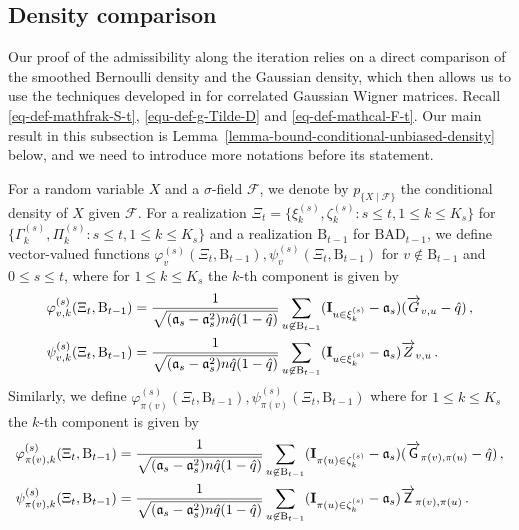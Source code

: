 \documentclass[11pt]{article}
\numberwithin{equation}{section}
\begin{document}
\subsection{Density comparison}
\label{sec:density-compare}
Our proof of the admissibility along the iteration relies on a direct comparison of the smoothed Bernoulli density and the Gaussian density, which then allows us to  use the techniques developed in \cite{DL22+} for correlated Gaussian Wigner matrices. Recall \eqref{eq-def-mathfrak-S-t}, \eqref{equ-def-g-Tilde-D} and \eqref{eq-def-mathcal-F-t}. Our main result in this subsection is Lemma~\ref{lemma-bound-conditional-unbiased-density} below, and we need to introduce more notations before its statement.

For a random variable $X$ and a $\sigma$-field $\mathcal F$, we denote by $p_{\{X\mid \mathcal F\}}$ the conditional density of $X$ given $\mathcal F$. For a realization $\Xi_t = \{\xi^{(s)}_k, \zeta^{(s)}_k : s \leq t, 1\leq k\leq K_s \}$ for $\{ \Gamma^{(s)}_k, \Pi^{(s)}_k : s \leq t, 1\leq k\leq K_s \}$ and a realization $\mathrm{B}_{t-1}$ for $\mathrm{BAD}_{t-1}$, we define vector-valued functions $\varphi^{(s)}_{v} (\Xi_t, \mathrm{B}_{t-1}), \psi^{(s)}_{v} (\Xi_t, \mathrm{B}_{t-1})$ for $v \not \in \mathrm{B}_{t-1}$ and $0\leq s\leq t$, where for $1\leq k\leq K_s$ the $k$-th component is given by  
\begin{equation}\label{eq-def-vector-value-function-1}
\begin{aligned}
    \varphi^{(s)}_{v, k} (\Xi_t, \mathrm{B}_{t-1}) &= \frac{1}{\sqrt{ (\mathfrak{a}_s - \mathfrak{a}_s^2) n \Hat{q}(1-\Hat{q}) }} \sum_{u \not \in \mathrm{B}_{t-1}} (\mathbf{I}_{u \in \xi^{(s)}_k}-\mathfrak{a}_s) (\overrightarrow{G}_{v,u}-\Hat{q}) \,, \\
    \psi^{(s)}_{v, k} (\Xi_t, \mathrm{B}_{t-1}) &= \frac{1}{\sqrt{ (\mathfrak{a}_s - \mathfrak{a}_s^2) n \Hat{q}(1-\Hat{q}) }} \sum_{u \not \in \mathrm{B}_{t-1}} (\mathbf{I}_{u \in \xi^{(s)}_k}-\mathfrak{a}_s) \overrightarrow{Z}_{v,u}\,.
\end{aligned}
\end{equation}
Similarly, we define $\varphi^{(s)}_{\pi(v)} (\Xi_t, \mathrm{B}_{t-1}), \psi^{(s)}_{\pi(v)} (\Xi_t, \mathrm{B}_{t-1})$ where for $1 \leq k \leq K_s$ the $k$-th component is given by  
\begin{equation}\label{eq-def-vector-value-function-2}
\begin{aligned}
    \varphi^{(s)}_{\pi(v), k} (\Xi_t, \mathrm{B}_{t-1}) &= \frac{1}{\sqrt{ (\mathfrak{a}_s - \mathfrak{a}_s^2) n \Hat{q}(1-\Hat{q}) }} \sum_{u \not \in \mathrm{B}_{t-1}} (\mathbf{I}_{\pi(u) \in \zeta^{(s)}_k}-\mathfrak{a}_s) (\overrightarrow{\mathsf G}_{\pi(v), \pi(u)}-\Hat{q}) \,, \\
    \psi^{(s)}_{\pi(v), k} (\Xi_t, \mathrm{B}_{t-1}) &= \frac{1}{\sqrt{ (\mathfrak{a}_s - \mathfrak{a}_s^2) n \Hat{q}(1-\Hat{q}) }} \sum_{u \not \in \mathrm{B}_{t-1}} (\mathbf{I}_{\pi(u) \in \zeta^{(s)}_k}-\mathfrak{a}_s) \overrightarrow{\mathsf Z}_{\pi(v), \pi(u)}\,.
\end{aligned}
\end{equation}
\end{document}
